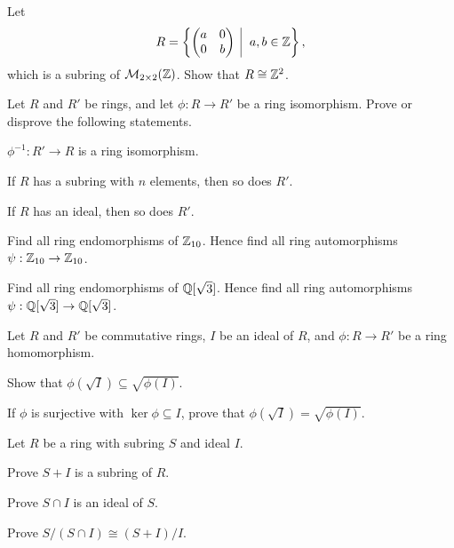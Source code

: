 \begin{problem}
    Let
    \[
        R = \left\{\begin{pmatrix}a&0\\0&b\end{pmatrix}\vert a,b \in \Z\right\},
    \]
    which is a subring of $\mathcal{M}_{2\times2}(\mathbb{Z})$. Show that $R \cong \mathbb{Z}^2$.
\end{problem}

\begin{problem}\label{problem-properties-of-ring-isomorphism}
    Let $R$ and $R'$ be rings, and let $\phi: R \to R'$ be a ring isomorphism. Prove or disprove the following statements.
    \begin{partquestions}{\alph*}
        \item $\phi^{-1}: R' \to R$ is a ring isomorphism.
        \item If $R$ has a subring with $n$ elements, then so does $R'$.
        \item If $R$ has an ideal, then so does $R'$.
    \end{partquestions}
\end{problem}

\begin{problem}
    Find all ring endomorphisms of $\mathbb{Z}_{10}$.\newline
    Hence find all ring automorphisms $\psi: \mathbb{Z}_{10} \to \mathbb{Z}_{10}$.
\end{problem}

\begin{problem}
    Find all ring endomorphisms of $\mathbb{Q}[\sqrt3]$.\newline
    Hence find all ring automorphisms $\psi: \mathbb{Q}[\sqrt3] \to \mathbb{Q}[\sqrt3]$.
\end{problem}

\begin{problem}
    Let $R$ and $R'$ be commutative rings, $I$ be an ideal of $R$, and $\phi: R\to R'$ be a ring homomorphism.
    \begin{partquestions}{\roman*}
        \item Show that $\phi(\sqrt I) \subseteq \sqrt{\phi(I)}$.
        \item If $\phi$ is surjective with $\ker\phi \subseteq I$, prove that $\phi(\sqrt I) = \sqrt{\phi(I)}$.
    \end{partquestions}
\end{problem}

\begin{problem}\label{problem-ring-isomorphism-2}
    Let $R$ be a ring with subring $S$ and ideal $I$.
    \begin{partquestions}{\roman*}
        \item Prove $S+I$ is a subring of $R$.
        \item Prove $S \cap I$ is an ideal of $S$.
        \item Prove $S/(S\cap I)\cong (S+I)/I$.
    \end{partquestions}
\end{problem}

